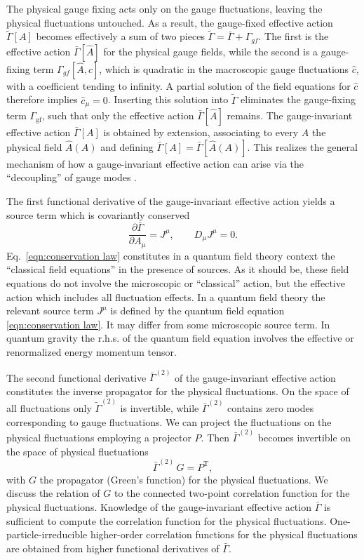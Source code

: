 \documentclass[twocolumn,aps,prd,amsmath,amssymb,preprintnumbers,longbibliography]{revtex4-1}
\numberwithin{equation}{section}
\newcommand{\transp}{\mathrm{T}}
\begin{document}
The physical gauge fixing acts only on the gauge fluctuations, leaving the physical fluctuations untouched. As a result, the gauge-fixed effective action $\tilde\Gamma[A]$ becomes effectively a sum of two pieces $\tilde{\Gamma}=\bar{\Gamma}+\Gamma_{gf}$. The first is the effective action $\bar\Gamma[\hat{A}]$ for the physical gauge fields, while the second is a gauge-fixing term $\Gamma_{gf}[\hat{A},\hat{c}]$, which is quadratic in the macroscopic gauge fluctuations $\hat{c}$, with a coefficient tending to infinity. A partial solution of the field equations for $\hat{c}$ therefore implies $\hat{c}_\mu = 0$. Inserting this solution into $\tilde\Gamma$ eliminates the gauge-fixing term $\Gamma_\text{gf}$, such that only the effective action $\bar\Gamma[\hat{A}]$ remains. The gauge-invariant effective action $\bar\Gamma[A]$ is obtained by extension, associating to every $A$ the physical field $\hat{A}(A)$ and defining $\bar\Gamma[A] = \bar\Gamma[\hat{A}(A)].$ This realizes the general mechanism of how a gauge-invariant effective action can arise via the ``decoupling'' of gauge modes \cite{CWGD}. 

The first functional derivative of the gauge-invariant effective action yields a source term which is covariantly conserved
\begin{equation}\label{eqn:conservation law}
	\frac{\partial \bar\Gamma}{\partial A_\mu}
	= J^\mu,
	\qquad
	D_\mu J^\mu
	= 0.
\end{equation}
Eq.~\eqref{eqn:conservation law} constitutes in a quantum field theory context the ``classical field equations'' in the presence of sources. As it should be, these field equations do not involve the microscopic or ``classical'' action, but the effective action which includes all fluctuation effects. In a quantum field theory the relevant source term $J^{\mu}$ is defined by the quantum field equation \eqref{eqn:conservation law}. It may differ from some microscopic source term. In quantum gravity the r.h.s. of the quantum field equation involves the effective or renormalized energy momentum tensor.

The second functional derivative $\bar\Gamma^{(2)}$ of the gauge-invariant effective action constitutes the inverse propagator for the physical fluctuations. On the space of all fluctuations only $\tilde\Gamma^{(2)}$ is invertible, while $\bar\Gamma^{(2)}$ contains zero modes corresponding to gauge fluctuations. We can project the fluctuations on the physical fluctuations employing a projector $P$. Then $\bar\Gamma^{(2)}$ becomes invertible on the space of physical fluctuations
\begin{equation}\label{eq:AS:8} 
	\bar\Gamma^{(2)} \, G
	= P^\transp,
\end{equation}
with $G$ the propagator (Green's function) for the physical fluctuations. We discuss the relation of $G$ to the connected two-point correlation function for the physical fluctuations. Knowledge of the gauge-invariant effective action $\bar\Gamma$ is sufficient to compute the correlation function for the physical fluctuations. One-particle-irreducible higher-order correlation functions for the physical fluctuations are obtained from higher functional derivatives of $\bar\Gamma$.
\end{document}
